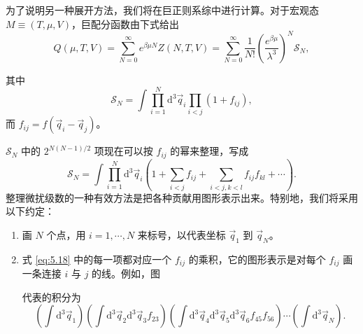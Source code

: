 为了说明另一种展开方法，我们将在巨正则系综中进行计算。对于宏观态 $M\equiv(T,\mu,V)$，巨配分函数由下式给出
\begin{equation}\label{eq:5.16}
Q(\mu,T,V)=\sum_{N=0}^\infty e^{\beta\mu N}Z(N,T,V)=\sum_{N=0}^\infty\frac{1}{N!}\left(\frac{e^{\beta\mu}}{\lambda^3}\right)^N\mathscr S_N,
\end{equation}


其中
\begin{equation}\label{eq:5.17}
\mathscr S_N=\int\prod_{i=1}^N\mathrm{d}^3\vec q_i\prod_{i<j}(1+f_{ij}),
\end{equation}
而 $f_{ij}=f(\vec q_i-\vec q_j)$。

$\mathscr S_N$ 中的 $2^{N(N-1)/2}$ 项现在可以按 $f_{ij}$ 的幂来整理，写成
\begin{equation}\label{eq:5.18}
\mathscr S_N=\int\prod_{i=1}^N\mathrm{d}^3\vec q_i\left(1+\sum_{i<j}f_{ij}+\sum_{i<j,k<l}f_{ij}f_{kl}+\cdots\right).
\end{equation}
整理微扰级数的一种有效方法是把各种贡献用图形表示出来。特别地，我们将采用以下约定：

\begin{enumerate}[label=(\alph*)]
\item 画 $N$ 个点，用 $i=1,\cdots,N$ 来标号，以代表坐标 $\vec q_1$ 到 $\vec q_N$。

\begin{center}
\end{center}

\item 式 \eqref{eq:5.18} 中的每一项都对应一个 $f_{ij}$ 的乘积，它的图形表示是对每个 $f_{ij}$ 画一条连接 $i$ 与 $j$ 的线。例如，图

\begin{center}
\end{center}

代表的积分为
\begin{equation*}
\left(\int\mathrm{d}^3\vec q_1\right)\left(\int\mathrm{d}^3\vec q_2\mathrm{d}^3\vec q_3f_{23}\right)\left(\int\mathrm{d}^3\vec q_4\mathrm{d}^3\vec q_5\mathrm{d}^3\vec q_6f_{45}f_{56}\right)\cdots\left(\int\mathrm{d}^3\vec q_N\right).
\end{equation*}
\end{enumerate}

